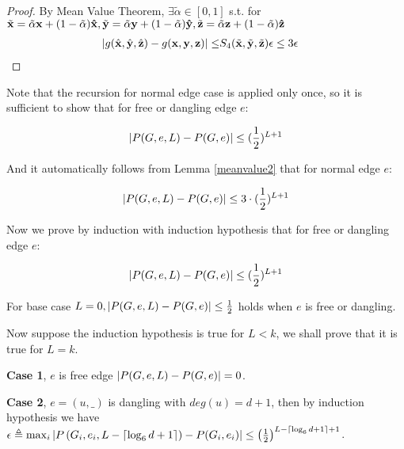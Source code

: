 \begin{proof}
         By Mean Value Theorem, $\exists \tilde{\alpha} \in [0,1]$ s.t. for $\tilde{\bf x} = \tilde{\alpha} {\bf x} + (1 - \tilde{\alpha}) {\bf \hat{x}}, \tilde{\bf y} = \tilde{\alpha} {\bf y} + (1 - \tilde{\alpha}) {\bf \hat{y}}, \tilde{\bf z} = \tilde{\alpha} {\bf z} + (1 - \tilde{\alpha}) {\bf \hat{z}}$
		\begin{align*}
		\left\vert g(\hat{\bf x}, \hat{\bf y}, \hat{\bf z}) - g({\bf x,y,z})\right\vert \leq &
		S_4(\tilde{\bf x},\tilde{\bf y},\tilde{\bf z} ) \epsilon
		\leq  3\epsilon
		\end{align*}
	\end{proof}



		Note that the recursion for normal edge case is applied only once, so it is sufficient to show that for free or dangling edge $e$:

		\[\left\vert P(G,e,L) - P(G,e)\right\vert \leq (\frac{1}{2})^{L+1}\]
		
		And it automatically follows from Lemma \ref{meanvalue2} that for normal edge $e$:

		\[\left\vert P(G,e,L) - P(G,e)\right\vert \leq 3\cdot(\frac{1}{2})^{L+1}\]

		Now we prove by induction with induction hypothesis that for free or dangling edge $e$:

		\[\left\vert P(G,e,L) - P(G,e)\right\vert \leq (\frac{1}{2})^{L+1}\]
		
		For base case $L=0, \left\vert P(G,e,L) - P(G,e)\right\vert \leq \frac{1}{2}$ holds when $e$ is free or dangling.

		Now suppose the induction hypothesis is true for $L<k$, we shall prove that it is true for $L=k$.

		{\bf Case 1}, $e$ is free edge $\left\vert P(G,e,L) - P(G,e)\right\vert = 0$.

		{\bf Case 2}, $e=(u,\_)$ is dangling with $deg(u)=d+1$, then by induction hypothesis we have
		$\epsilon \triangleq \max_i \left\vert P\left(G_i,e_i,L-\lceil \log_6{d+1}\rceil \right) - P(G_i,e_i)\right\vert \leq \left(\frac{1}{2}\right)^{L-\lceil \log_6{d+1}\rceil + 1}$.

